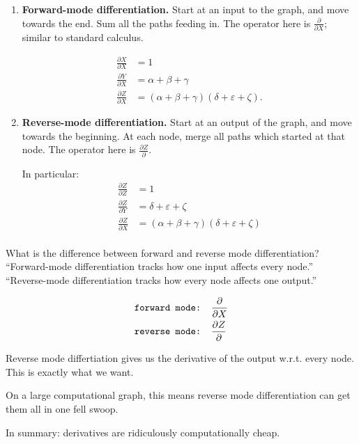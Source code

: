 \begin{enumerate}
  \item {\bf Forward-mode differentiation.} Start at an input to the graph, and move towards the end.  Sum all the paths feeding in.  The operator here is $\frac{\partial}{\partial X}$; similar to standard calculus.

    \begin{align*}
      \frac{\partial X}{\partial X} &= 1 \\
      \frac{\partial Y}{\partial X} &= \alpha + \beta + \gamma \\
      \frac{\partial Z}{\partial X} &= (\alpha + \beta + \gamma)(\delta + \varepsilon +\zeta).
    \end{align*}

  \item {\bf Reverse-mode differentiation.} Start at an output of the graph, and move towards the beginning.  At each node, merge all paths which started at that node.  The operator here is $\frac{\partial Z}{\partial }$.

    In particular:
    \begin{align*}
      \frac{\partial Z}{\partial Z} &= 1 \\
      \frac{\partial Z}{\partial Y} &= \delta + \varepsilon + \zeta  \\
      \frac{\partial Z}{\partial X} &= (\alpha + \beta + \gamma)(\delta + \varepsilon + \zeta) \\
    \end{align*}

\end{enumerate}

What is the difference between forward and reverse mode differentiation?  ``Forward-mode differentiation tracks how one input affects every node.''  ``Reverse-mode differentiation tracks how every node affects one output.''

\begin{align*}
  \texttt{forward mode: } &\frac{\partial}{\partial X} \\
  \texttt{reverse mode: } &\frac{\partial Z}{\partial}
\end{align*}

Reverse mode differtiation gives us the derivative of the output w.r.t. every node. This is exactly what we want.

On a large computational graph, this means reverse mode differentiation can get them all in one fell swoop.

In summary: derivatives are ridiculously computationally cheap.




